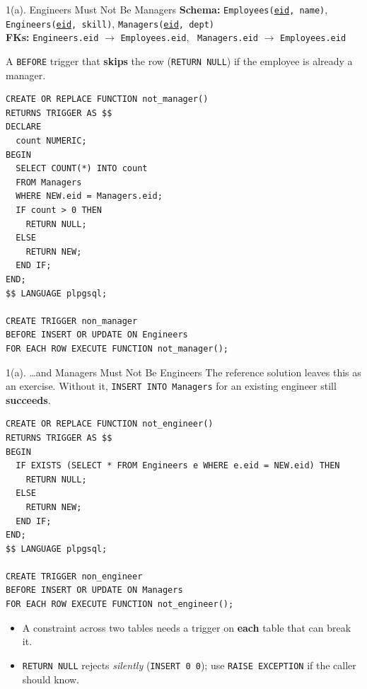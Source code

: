 \documentclass{beamer}
\begin{document}
\begin{frame}[fragile,shrink=6]{1(a). Engineers Must Not Be Managers}
\footnotesize
{\scriptsize \textbf{Schema:} \texttt{Employees(\underline{eid}, name)}, \texttt{Engineers(\underline{eid}, skill)}, \texttt{Managers(\underline{eid}, dept)}\\
\textbf{FKs:} \texttt{Engineers.eid} $\to$ \texttt{Employees.eid}, \ \texttt{Managers.eid} $\to$ \texttt{Employees.eid}}
\medskip

A \texttt{BEFORE} trigger that \textbf{skips} the row (\texttt{RETURN NULL}) if the employee is already a manager.
\begin{lstlisting}[language=plpgsql]
CREATE OR REPLACE FUNCTION not_manager()
RETURNS TRIGGER AS $$
DECLARE
  count NUMERIC;
BEGIN
  SELECT COUNT(*) INTO count
  FROM Managers
  WHERE NEW.eid = Managers.eid;
  IF count > 0 THEN
    RETURN NULL;
  ELSE
    RETURN NEW;
  END IF;
END;
$$ LANGUAGE plpgsql;

CREATE TRIGGER non_manager
BEFORE INSERT OR UPDATE ON Engineers
FOR EACH ROW EXECUTE FUNCTION not_manager();
\end{lstlisting}
\end{frame}

\begin{frame}[fragile,shrink=6]{1(a). \ldots and Managers Must Not Be Engineers}
\footnotesize
The reference solution leaves this as an exercise. Without it, \texttt{INSERT INTO Managers} for an existing engineer still \textbf{succeeds}.
\begin{lstlisting}[language=plpgsql]
CREATE OR REPLACE FUNCTION not_engineer()
RETURNS TRIGGER AS $$
BEGIN
  IF EXISTS (SELECT * FROM Engineers e WHERE e.eid = NEW.eid) THEN
    RETURN NULL;
  ELSE
    RETURN NEW;
  END IF;
END;
$$ LANGUAGE plpgsql;

CREATE TRIGGER non_engineer
BEFORE INSERT OR UPDATE ON Managers
FOR EACH ROW EXECUTE FUNCTION not_engineer();
\end{lstlisting}
\begin{itemize}
  \item A constraint across two tables needs a trigger on \textbf{each} table that can break it.
  \item \texttt{RETURN NULL} rejects \emph{silently} (\texttt{INSERT 0 0}); use \texttt{RAISE EXCEPTION} if the caller should know.
\end{itemize}
\end{frame}
\end{document}
